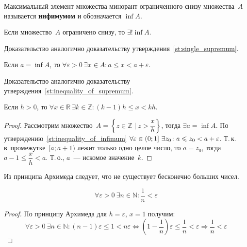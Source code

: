 Максимальный элемент множества минорант ограниченного снизу множества~$A$ называется \textbf{инфимумом} и обозначается $\inf A$.

\begin{statement}
Если множество~$A$ ограничено снизу, то $\exists! \inf A$.
\end{statement}%
Доказательство аналогично доказательству утверждения~\ref*{st:single_supremum}.

\begin{statement}
\label{st:inequality_of_infimum}
Если $a = \inf A$, то $\forall \varepsilon > 0 \ \exists x \in A \colon a \leqslant x < a + \varepsilon$.
\end{statement}%
Доказательство аналогично доказательству утверждения~\ref*{st:inequality_of_supremum}.

\begin{theorem}
Если $h > 0$, то
$\forall x \in \mathbb R \ \exists k \in \mathbb Z \colon (k - 1)h \leqslant x < kh$.
\end{theorem}
\begin{proof}
Рассмотрим множество~$A = \left\{ z \in \mathbb Z \mid z > \dfrac{x}h \right\}$, тогда $\exists a = \inf A$.
По утверждению~\ref*{st:inequality_of_infimum}
$\forall \varepsilon \in \nobreak (0; 1] \ \exists z_0 \colon a \leqslant z_0 < a + \varepsilon$.
Т.\,к. в~промежутке~$[a; a + 1)$ лежит только одно целое число, то $a = z_0$, тогда $a - 1 \leqslant \dfrac{x}h < a$.
Т.\,о., $a$~--- искомое значение~$k$.
\end{proof}

Из принципа Архимеда следует, что не существует бесконечно больших чисел.

\begin{consequent}
\label{conseq:small_rational_exists}
\begin{equation*}
\forall \varepsilon > 0 \ \exists n \in \mathbb N \colon \frac1n < \varepsilon
\end{equation*}
\end{consequent}
\begin{proof}
По принципу Архимеда для $h = \varepsilon$, $x = 1$ получим:
\begin{equation*}
\forall \varepsilon > 0 \ \exists n \in \mathbb N \colon
(n - 1)\varepsilon \leqslant 1 < n\varepsilon \Leftrightarrow
(1 - \frac1n)\varepsilon \leqslant \frac1n < \varepsilon \Rightarrow
\frac1n < \varepsilon
\end{equation*}
\end{proof}

